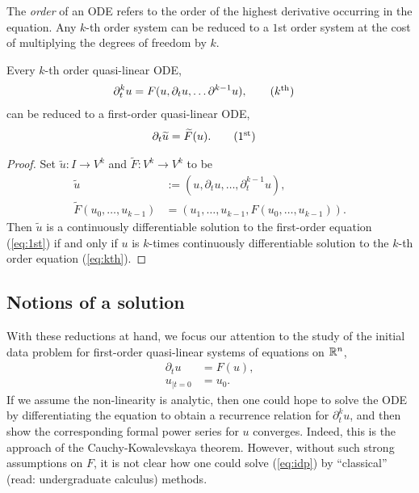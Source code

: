 The \emph{order} of an ODE refers to the order of the highest derivative occurring in the equation. Any $k$-th order system can be reduced to a $1$st order system at the cost of multiplying the degrees of freedom by $k$. 

\begin{proposition}
	Every $k$-th order quasi-linear ODE, 
		\begin{align}
			\partial_t^k  u
				&= F(u, \partial_t u, \dots \partial^{k - 1} u),
				\tag{$k^{\text{th}}$}
				\label{eq:kth}
		\end{align}
	can be reduced to a first-order quasi-linear ODE,
		\begin{align}
			\partial_t \widetilde u
				&= \widetilde F (u). 
				\tag{$1^{\text{st}}$}
				\label{eq:1st}
		\end{align}
\end{proposition}

\begin{proof}
	Set $\widetilde u : I \to V^k$ and $\widetilde F: V^k \to V^k$ to be
		\begin{align*}
			\widetilde u 
				&:= (u, \partial_t u, \dots, \partial_t^{k - 1} u) ,\\
			\widetilde F (u_0, \dots, u_{k - 1})
				&= (u_1, \dots, u_{k - 1}, F(u_0, \dots, u_{k - 1}))	.
		\end{align*}	
	Then $\widetilde u$ is a continuously differentiable solution to the first-order equation (\ref{eq:1st}) if and only if $u$ is $k$-times continuously differentiable solution to the $k$-th order equation (\ref{eq:kth}). 	
\end{proof}


\subsection{Notions of a solution}

With these reductions at hand, we focus our attention to the study of the initial data problem for first-order quasi-linear systems of equations on $\mathbb R^n$, 
\begin{equation}
	\begin{split}
		\partial_t u 	&= F(u), \\
		u_{|t = 0}		&= u_0.
	\end{split}\tag{IDP}	\label{eq:idp}
\end{equation}
If we assume the non-linearity is analytic, then one could hope to solve the ODE by differentiating the equation to obtain a recurrence relation for $\partial_t^k u$, and then show the corresponding formal power series for $u$ converges. Indeed, this is the approach of the Cauchy-Kowalevskaya theorem. However, without such strong assumptions on $F$, it is not clear how one could solve (\ref{eq:idp}) by ``classical'' (read: undergraduate calculus) methods. 

